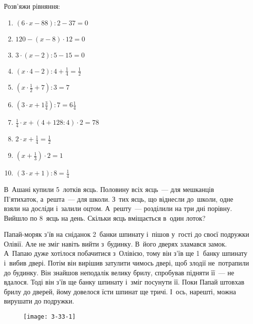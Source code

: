\problem
Розв’яжи рівняння:
\begin{multicols}{2}
    \begin{enumerate}
        \item $(6 \cdot x - 88) : 2 - 37 = 0$
        \item $120 - (x - 8) \cdot 12 = 0$
        \item $3 \cdot (x - 2) : 5 - 15 = 0$
        \item $(x \cdot 4 - 2) : 4 + \frac{1}{4} = \frac{1}{2}$
        \item $(x \cdot \frac{1}{2} + 7) : 3 = 7$
        \item $(3 \cdot x + 1\frac{3}{4}) : 7 = 6\frac{1}{4}$
        \item $\frac{1}{4} \cdot x + (4 + 128 : 4) \cdot 2 = 78$
        \item $2 \cdot x + \frac{1}{4} = \frac{1}{2}$
        \item $(x + \frac{1}{3}) \cdot 2 = 1$
        \item $(3 \cdot x + 1) : 8 = \frac{1}{4}$
    \end{enumerate}
\end{multicols}


\problem
В~Ашані купили 5~лотків яєць.
Половину всіх яєць~--- для мешканців П'ятихаток, а~решта~--- для школи.
З~тих яєць, що віднесли до~школи, одне взяли на досліди і~залили оцтом.
А~решту~--- розділили на три дні порівну. Вийшло по 8~яєць на день.
Скільки яєць вміщається в~один лоток? 


\problem
Папай-моряк з’їв на сніданок 2~банки шпинату і~пішов у~гості до своєї
подружки Олівії. Але не зміг навіть вийти з~будинку. В~його дверях
зламався замок. А~Папаю дуже хотілося побачитися з~Олівією, тому він
з’їв ще 1~банку шпинату і~вибив двері. Потім він вирішив затулити
чимось двері, щоб злодії не~потрапили до будинку. Він знайшов неподалік
велику брилу, спробував підняти її~--- не вдалося. Тоді він з’їв ще банку
шпинату і~зміг посунути її. Поки Папай штовхав брилу до дверей, йому
довелося їсти шпинат ще тричі. І~ось, нарешті, можна вирушати до подружки.

\begin{wrapfigure}{l}{0.4\textwidth}
    \vspace{-20pt}
    \begin{center}
        \texttt{[image: 3-33-1]}
    \end{center}
    \vspace{-20pt}
\end{wrapfigure}


